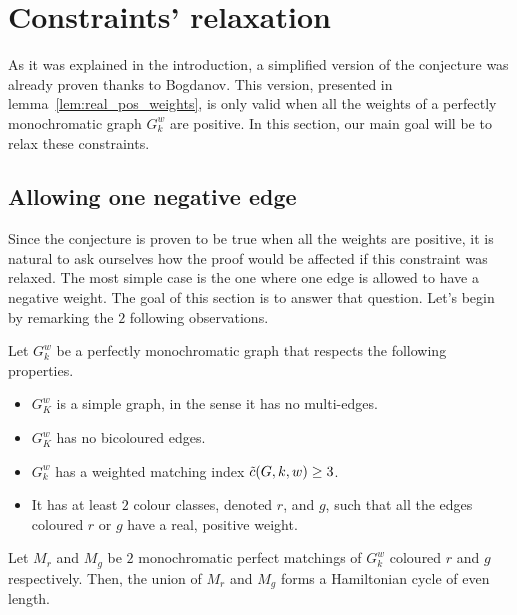 \section{Constraints' relaxation}
\label{sec:constraints-relaxation}

As it was explained in the introduction, a simplified version of the conjecture was already proven thanks to Bogdanov.\cite{bogdanov}
This version, presented in lemma~\ref{lem:real_pos_weights}, is only valid when all the weights of a perfectly monochromatic graph $G_k^w$ are positive.
In this section, our main goal will be to relax these constraints.

\subsection{Allowing one negative edge}
\label{subsec:one_negative_edge}

Since the conjecture is proven to be true when all the weights are positive, it is natural to ask ourselves how the proof would be affected if this constraint was relaxed.
The most simple case is the one where one edge is allowed to have a negative weight.
The goal of this section is to answer that question.
Let's begin by remarking the $2$ following observations.

\begin{observation}
    \label{obs:2_positive_classes_ham_cycle}
    Let $G_k^w$ be a perfectly monochromatic graph that respects the following properties.
    \begin{itemize}
        \item $G_K^w$ is a simple graph, in the sense it has no multi-edges.
        \item $G_K^w$ has no bicoloured edges.
        \item $G_k^w$ has a weighted matching index $\Tilde{c}(G, k, w) \geq 3$.
        \item It has at least $2$ colour classes, denoted $r$, and $g$, such that all the edges coloured $r$ or $g$ have a real, positive weight.
    \end{itemize}

    Let $M_r$ and $M_g$ be $2$ monochromatic perfect matchings of $G_k^w$ coloured $r$ and $g$ respectively.
    Then, the union of $M_r$ and $M_g$ forms a Hamiltonian cycle of even length.
\end{observation}

